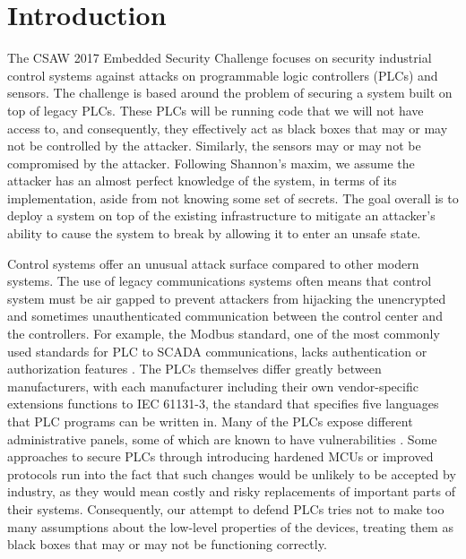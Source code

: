 \documentclass[10pt,twocolumn]{IEEEtran}
\begin{document}
\section{Introduction}
The CSAW 2017 Embedded Security Challenge focuses on security industrial control systems against attacks on programmable logic controllers (PLCs) and sensors.
The challenge is based around the problem of securing a system built on top of legacy PLCs.
These PLCs will be running code that we will not have access to, and consequently, they effectively act as black boxes that may or may not be controlled by the attacker.
Similarly, the sensors may or may not be compromised by the attacker.
Following Shannon's maxim, we assume the attacker has an almost perfect knowledge of the system, in terms of its implementation, aside from not knowing some set of secrets.
The goal overall is to deploy a system on top of the existing infrastructure to mitigate an attacker's ability to cause the system to break by allowing it to enter an unsafe state.

Control systems offer an unusual attack surface compared to other modern systems.
The use of legacy communications systems often means that control system must be air gapped to prevent attackers from hijacking the unencrypted and sometimes unauthenticated communication between the control center and the controllers.
For example, the Modbus standard, one of the most commonly used standards for PLC to SCADA communications, lacks authentication or authorization features \cite{modbus}.
The PLCs themselves differ greatly between manufacturers, with each manufacturer including their own vendor-specific extensions functions to IEC 61131-3, the standard that specifies five languages that PLC programs can be written in.
Many of the PLCs expose different administrative panels, some of which are known to have vulnerabilities \cite{metasploit}.
Some approaches to secure PLCs through introducing hardened MCUs or improved protocols run into the fact that such changes would be unlikely to be accepted by industry, as they would mean costly and risky replacements of important parts of their systems.
Consequently, our attempt to defend PLCs tries not to make too many assumptions about the low-level properties of the devices, treating them as black boxes that may or may not be functioning correctly.
\end{document}
